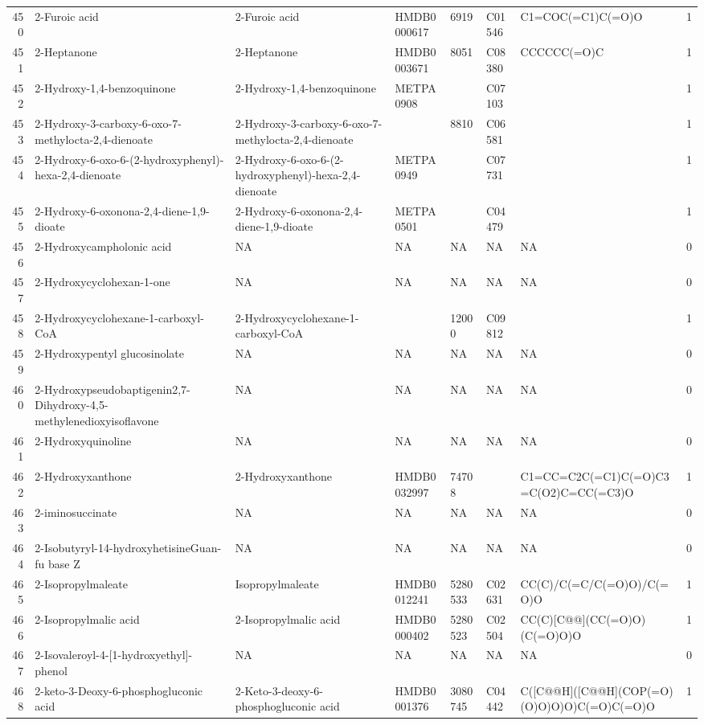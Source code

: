 \documentclass[a4paper]{article}
\begin{document}
\begin{longtable}{rlllllll}
  450 & 2-Furoic acid & 2-Furoic acid & HMDB0000617 & 6919 & C01546 & C1=COC(=C1)C(=O)O & 1 \\ 
  451 & 2-Heptanone & 2-Heptanone & HMDB0003671 & 8051 & C08380 & CCCCCC(=O)C & 1 \\ 
  452 & 2-Hydroxy-1,4-benzoquinone & 2-Hydroxy-1,4-benzoquinone & METPA0908 &  & C07103 &  & 1 \\ 
  453 & 2-Hydroxy-3-carboxy-6-oxo-7-methylocta-2,4-dienoate & 2-Hydroxy-3-carboxy-6-oxo-7-methylocta-2,4-dienoate &  & 8810 & C06581 &  & 1 \\ 
  454 & 2-Hydroxy-6-oxo-6-(2-hydroxyphenyl)-hexa-2,4-dienoate & 2-Hydroxy-6-oxo-6-(2-hydroxyphenyl)-hexa-2,4-dienoate & METPA0949 &  & C07731 &  & 1 \\ 
  455 & 2-Hydroxy-6-oxonona-2,4-diene-1,9-dioate & 2-Hydroxy-6-oxonona-2,4-diene-1,9-dioate & METPA0501 &  & C04479 &  & 1 \\ 
  456 & 2-Hydroxycampholonic acid & NA & NA & NA & NA & NA & 0 \\ 
  457 & 2-Hydroxycyclohexan-1-one & NA & NA & NA & NA & NA & 0 \\ 
  458 & 2-Hydroxycyclohexane-1-carboxyl-CoA & 2-Hydroxycyclohexane-1-carboxyl-CoA &  & 12000 & C09812 &  & 1 \\ 
  459 & 2-Hydroxypentyl glucosinolate & NA & NA & NA & NA & NA & 0 \\ 
  460 & 2-Hydroxypseudobaptigenin2,7-Dihydroxy-4,5-methylenedioxyisoflavone & NA & NA & NA & NA & NA & 0 \\ 
  461 & 2-Hydroxyquinoline & NA & NA & NA & NA & NA & 0 \\ 
  462 & 2-Hydroxyxanthone & 2-Hydroxyxanthone & HMDB0032997 & 74708 &  & C1=CC=C2C(=C1)C(=O)C3=C(O2)C=CC(=C3)O & 1 \\ 
  463 & 2-iminosuccinate & NA & NA & NA & NA & NA & 0 \\ 
  464 & 2-Isobutyryl-14-hydroxyhetisineGuan-fu base Z & NA & NA & NA & NA & NA & 0 \\ 
  465 & 2-Isopropylmaleate & Isopropylmaleate & HMDB0012241 & 5280533 & C02631 & CC(C)/C(=C/C(=O)O)/C(=O)O & 1 \\ 
  466 & 2-Isopropylmalic acid & 2-Isopropylmalic acid & HMDB0000402 & 5280523 & C02504 & CC(C)[C@@](CC(=O)O)(C(=O)O)O & 1 \\ 
  467 & 2-Isovaleroyl-4-[1-hydroxyethyl]-phenol & NA & NA & NA & NA & NA & 0 \\ 
  468 & 2-keto-3-Deoxy-6-phosphogluconic acid & 2-Keto-3-deoxy-6-phosphogluconic acid & HMDB0001376 & 3080745 & C04442 & C([C@@H]([C@@H](COP(=O)(O)O)O)O)C(=O)C(=O)O & 1 \\ 

\end{longtable}
\end{document}
